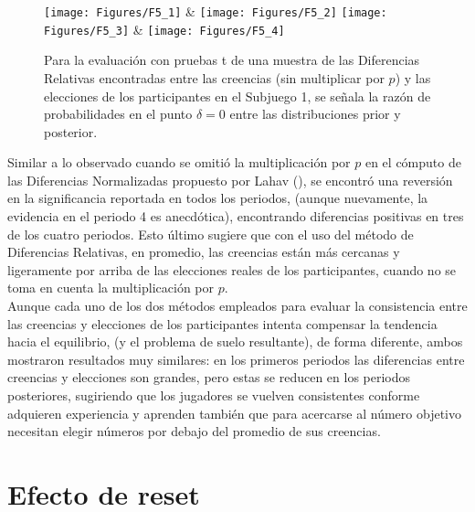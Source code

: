 \begin{figure}[h]
\centering
\texttt{[image: Figures/F5\_1]} & \texttt{[image: Figures/F5\_2]} 
\texttt{[image: Figures/F5\_3]} & \texttt{[image: Figures/F5\_4]} 
\decoRule
\caption[Diferencias Relativas entre creencias y elecciones en el Subjuego 1 sin la multiplicación por p (Factor de Bayes)]{Para la evaluación con pruebas t de una muestra de las Diferencias Relativas encontradas entre las creencias (sin multiplicar por $p$) y las elecciones de los participantes en el Subjuego 1, se señala la razón de probabilidades en el punto $\delta = 0$ entre las distribuciones prior y posterior.}
\label{fig:DRnop_S1}
\end{figure}


Similar a lo observado cuando se omitió la multiplicación por $p$ en el cómputo de las Diferencias Normalizadas propuesto por Lahav (\citeyear{Lahav}), se encontró una reversión en la significancia reportada en todos los periodos, (aunque nuevamente, la evidencia en el periodo 4 es anecdótica), encontrando diferencias positivas en tres de los cuatro periodos. Esto último sugiere que con el uso del método de Diferencias Relativas, en promedio, las creencias están más cercanas y ligeramente por arriba de las elecciones reales de los participantes, cuando no se toma en cuenta la multiplicación por $p$.\\

Aunque cada uno de los dos métodos empleados para evaluar la consistencia entre las creencias y elecciones de los participantes intenta compensar la tendencia hacia el equilibrio, (y el problema de suelo resultante), de forma diferente, ambos mostraron resultados muy similares: en los primeros periodos las diferencias entre creencias y elecciones son grandes, pero estas se reducen en los periodos posteriores, sugiriendo que los jugadores se vuelven consistentes conforme adquieren experiencia y aprenden también que para acercarse al número objetivo necesitan elegir números por debajo del promedio de sus creencias.\\

\section{Efecto de reset}\\

